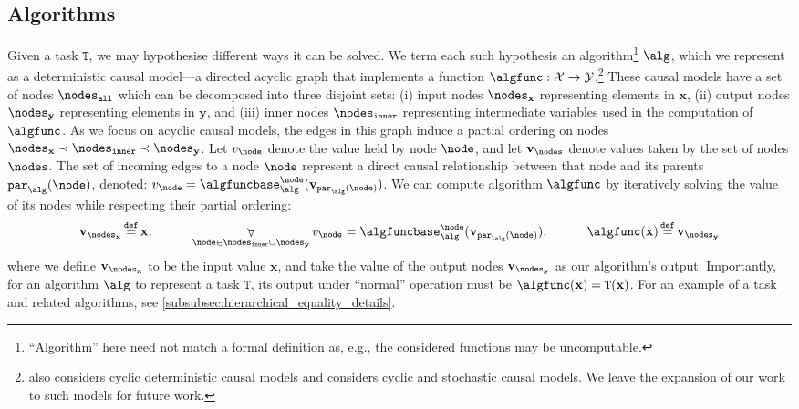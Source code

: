 \documentclass{article}
\newcommand{\bx}{\mathbf{x}}
\newcommand{\calX}{\mathcal{X}}
\newcommand{\by}{\mathbf{y}}
\newcommand{\calY}{\mathcal{Y}}
\newcommand{\ftask}{\mathtt{T}}
\newcommand{\algfuncnode}[1]{\algfuncbase_{\alg}^{#1}}
\newcommand{\parents}{\mathtt{par}_{\alg}}
\newcommand{\nodevalue}{v}
\newcommand{\nodesvalues}{\mathbf{v}}
\newcommand{\nodesinput}{\nodes_{\bx}}
\newcommand{\nodesoutput}{\nodes_{\by}}
\newcommand{\nodesinner}{\nodes_{\mathtt{inner}}}
\begin{document}
\vspace{-2pt}
\subsection{Algorithms} \label{sec:algorithm}
\vspace{-1pt}

\newcommand{\partialsmall}{\prec}
\newcommand{\partialsmallalg}{\prec_{\alg}}
\newcommand{\partialsmalldnn}{\prec_{\dnn}}
\newcommand{\constants}{\mathbf{c}}
\newcommand{\constant}{c}
\newcommand{\nodesall}{\nodes_{\mathtt{all}}}

Given a task $\ftask$, we may hypothesise different ways it can be solved.
We term each such hypothesis an algorithm\footnote{“Algorithm” here need not match a formal definition as, e.g., the considered functions may be uncomputable.} $\alg$, which we represent as a deterministic causal model---a directed acyclic graph that implements a function $\algfunc: \calX \to \calY$.\footnote{\citet{Geiger2023CausalAA} also considers cyclic deterministic causal models and \citet{Beckers2018AbstractingCM} considers cyclic and stochastic causal models. We leave the expansion of our work to such models for future work.}
These causal models have a set of nodes $\nodesall$ which can be decomposed into three disjoint sets: (i) input nodes $\nodesinput$ representing elements in $\bx$,
(ii) output nodes $\nodesoutput$ representing elements in $\by$,
and
(iii) inner nodes $\nodesinner$
representing intermediate variables used in the computation of $\algfunc$.
As we focus on acyclic causal models, the edges in this graph induce a partial ordering on nodes $\nodesinput \partialsmall \nodesinner \partialsmall \nodesoutput$.
Let $\nodevalue_\node$ denote the value held by node $\node$, and let $\nodesvalues_\nodes$ denote values taken by the set of nodes $\nodes$.
The set of incoming edges to a node $\node$ represent a direct causal relationship between that node and its parents $\parents(\node)$, denoted: $\nodevalue_{\node} = \algfuncnode{\node}(\nodesvalues_{\parents(\node)})$.
We can compute algorithm $\algfunc$
by iteratively solving the value of its nodes while respecting their partial ordering:
\begin{align}
    \nodesvalues_{\nodesinput} \defeq \bx, \qquad\quad 
    \mathop{\forall}_{\node \in \nodesinner \cup \nodesoutput}
    \nodevalue_{\node} = \algfuncnode{\node}(\nodesvalues_{\parents(\node)}), \qquad\quad
    \algfunc(\bx) \defeq \nodesvalues_{\nodesoutput}
\end{align}
where we define $\nodesvalues_{\nodesinput}$ to be the input value $\bx$, and take the value of the output nodes $\nodesvalues_{\nodesoutput}$ as our algorithm's output.
Importantly, for an algorithm $\alg$ to represent a task $\ftask$, its output under ``normal'' operation must be $\algfunc(\bx) = \ftask(\bx)$.
For an example of a task and related algorithms, see \cref{subsubsec:hierarchical_equality_details}.
\end{document}
